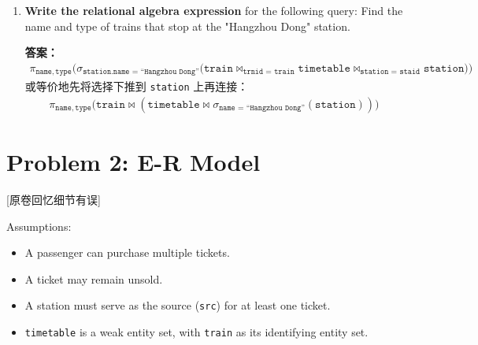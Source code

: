 \documentclass[11pt,a4paper]{article}
\newcommand{\answer}{\par\noindent\textcolor{ansred}{\textbf{答案：}}}
\newcommand{\recallnote}{\textcolor{ansred}{[原卷回忆细节有误]}}
\begin{document}
\begin{enumerate}[leftmargin=*,itemsep=6pt]
  \answer \textcolor{ansred}{$\surd$（True）}

\item \textbf{Write the relational algebra expression} for the following query:
  Find the name and type of trains that stop at the "Hangzhou Dong" station.

  \answer
  \begin{align*}
    \pi_{\texttt{name},\,\texttt{type}}\Big(
      \sigma_{\texttt{station.name = ``Hangzhou Dong''}}\big(
        \texttt{train} \Join_{\texttt{trnid = train}} \texttt{timetable}
        \Join_{\texttt{station = staid}} \texttt{station}
      \big)
    \Big)
  \end{align*}
  或等价地先将选择下推到 \texttt{station} 上再连接：
  \begin{align*}
    \pi_{\texttt{name},\,\texttt{type}}\Big(
      \texttt{train} \Join (\texttt{timetable} \Join
      \sigma_{\texttt{name = ``Hangzhou Dong''}}(\texttt{station}))
    \Big)
  \end{align*}

\end{enumerate}

\section*{Problem 2: E-R Model}

\recallnote

\noindent Assumptions:
\begin{itemize}[nosep]
  \item A passenger can purchase multiple tickets.
  \item A ticket may remain unsold.
  \item A station must serve as the source (\texttt{src}) for at least one ticket.
  \item \texttt{timetable} is a weak entity set, with \texttt{train} as its
        identifying entity set.
\end{itemize}
\end{document}

